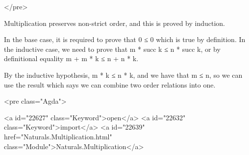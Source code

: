 </pre>

Multiplication preserves non-strict order, and this is proved by induction.

In the base case, it is required to prove that 0 ≤ 0 which is true by
definition.  In the inductive case, we need to prove that
m * succ k ≤ n * succ k, or by definitional equality m + m * k ≤ n + n * k.

By the inductive hypothesis, m * k ≤ n * k, and we have that m ≤ n, so we
can use the result which says we can combine two order relations into one.

<pre class="Agda">

<a id="22627" class="Keyword">open</a> <a id="22632" class="Keyword">import</a> <a id="22639" href="Naturals.Multiplication.html" class="Module">Naturals.Multiplication</a>

